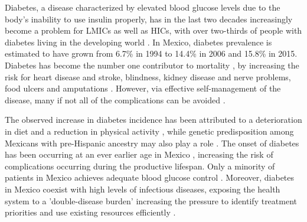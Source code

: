 \documentclass[12pt,english]{article}
\begin{document}
Diabetes, a disease characterized by elevated blood glucose levels due to the body's inability to use insulin properly, has in the last two decades increasingly become a problem for \acp{LMIC} as well as \acp{HIC}, with over two-thirds of people with diabetes living in the developing world \parencite{InternationalDiabetesFederation2015}. In Mexico, diabetes prevalence is estimated to have grown from 6.7\% in 1994 to 14.4\% in 2006 \parencite{Barquera2013} and 15.8\% in 2015. Diabetes has become the number one contributor to mortality \parencite{InternationalDiabetesFederation2015}, by increasing the risk for heart disease and stroke, blindness, kidney disease and nerve problems, food ulcers and amputations \parencite{Reynoso-Noveron2011}. However, via effective self-management of the disease, many if not all of the complications can be avoided \parencite{Lim2011, Gregg2012}.

The observed increase in diabetes incidence has been attributed to a deterioration in diet and a reduction in physical activity \parencite{Barquera2008b,Basu2013}, while genetic predisposition among Mexicans with pre-Hispanic ancestry may also play a role \parencite{Williams2013}. The onset of diabetes has been occurring at an ever earlier age in Mexico \parencite{Bello-Chavolla2017a}, increasing the risk of complications occurring during the productive lifespan. Only a minority of patients in Mexico achieves adequate blood glucose control \parencite{Barquera2013}. Moreover, diabetes in Mexico coexist with high levels of infectious diseases, exposing the health system to a 'double-disease burden' increasing the pressure to identify treatment priorities and use existing resources efficiently \parencite{Gutierrez-delgado2009}.
\end{document}
